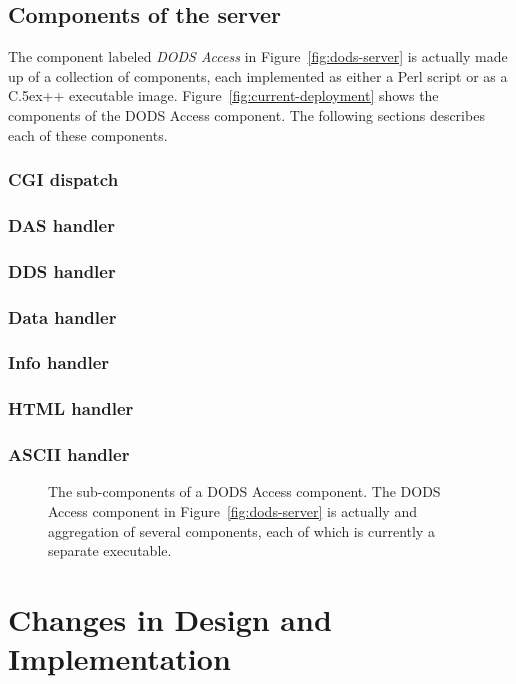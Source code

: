 \documentclass{article}
\newcommand{\Cpp}{\rm {\small C}\raise.5ex\hbox{\footnotesize ++}\xspace}
\begin{document}
\subsection{Components of the server}
The component labeled \emph{DODS Access} in Figure~\ref{fig:dods-server} is
actually made up of a collection of components, each implemented as either a
Perl script or as a \Cpp executable image.
Figure~\ref{fig:current-deployment} shows the components of the DODS Access
component. The following sections describes each of these components.

\subsubsection{CGI dispatch}
\subsubsection{DAS handler}
\subsubsection{DDS handler}
\subsubsection{Data handler}
\subsubsection{Info handler}
\subsubsection{HTML handler}
\subsubsection{ASCII handler}

\begin{figure}[h]
\begin{center}
\caption{The sub-components of a DODS Access component. The DODS Access
  component in Figure~\ref{fig:dods-server} is actually and aggregation of
  several components, each of which is currently a separate executable.}
\label{fig:current-server-arch}
\end{center}
\end{figure}

\section{Changes in Design and Implementation}
\label{sec:design}
\end{document}
